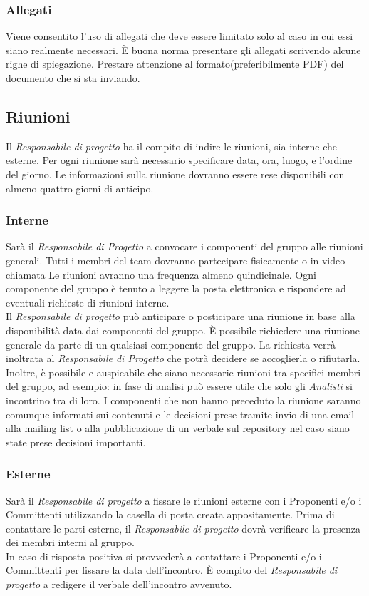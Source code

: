 		\subsubsection{Allegati}
Viene consentito l'uso di allegati che deve essere limitato solo al caso in cui essi siano realmente necessari. È buona norma presentare gli allegati scrivendo alcune righe di spiegazione. Prestare attenzione al formato(preferibilmente PDF) del documento che si sta inviando. 

	\subsection{Riunioni}
Il \textit{Responsabile di progetto} ha il compito di indire le riunioni, sia interne che esterne. Per ogni riunione sarà necessario specificare data, ora, luogo, e l'ordine del giorno. Le informazioni sulla riunione dovranno essere rese disponibili con almeno quattro giorni di anticipo.
		\subsubsection{Interne}
Sarà il \textit{Responsabile di Progetto} a convocare i componenti del gruppo alle riunioni generali. Tutti i membri del team dovranno partecipare fisicamente o in video chiamata Le riunioni avranno una frequenza almeno quindicinale. Ogni componente del gruppo è tenuto a leggere la posta elettronica e rispondere ad eventuali richieste di riunioni interne. \\
Il \textit{Responsabile di progetto} può anticipare o posticipare una riunione in base alla disponibilità data dai componenti del gruppo. È possibile richiedere una riunione generale da parte di un qualsiasi componente del gruppo. La richiesta verrà inoltrata al \textit{Responsabile di Progetto} che potrà decidere se accoglierla o rifiutarla.\\
Inoltre, è possibile e auspicabile che siano necessarie riunioni tra specifici membri del gruppo, ad esempio: in fase di analisi può essere utile che solo gli \textit{Analisti} si incontrino tra di loro. I componenti che non hanno preceduto la riunione saranno comunque informati sui contenuti e le decisioni prese tramite invio di una email alla mailing list o alla pubblicazione di un \gls{verbale} sul \gls{repository} nel caso siano state prese decisioni importanti.
		\subsubsection{Esterne}
Sarà il \textit{Responsabile di progetto} a fissare le riunioni esterne con i Proponenti e/o i Committenti utilizzando la casella di posta creata appositamente. Prima di contattare le parti esterne, il \textit{Responsabile di progetto} dovrà verificare la presenza dei membri interni al gruppo. \\
In caso di risposta positiva si provvederà a contattare i Proponenti e/o i Committenti per fissare la data dell'incontro.
È compito del \textit{Responsabile di progetto} a redigere il \gls{verbale} dell'incontro avvenuto.

